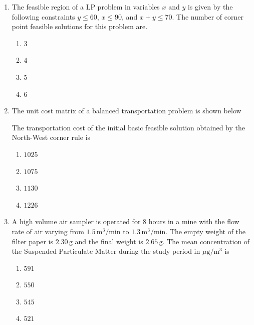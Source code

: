 \documentclass[journal,12pt,onecolumn]{IEEEtran}
\theoremstyle{remark}
\begin{document}
\begin{enumerate}
\item The feasible region of a LP problem in variables $x$ and $y$ is given by the following constraints  
$y \leq 60$, $x \leq 90$, and $x + y \leq 70$.
The number of corner point feasible solutions for this problem are.
\

\hfill{}

\begin{multicols}{4}
\begin{enumerate}
\item $3$
\item $4$
\item $5$
\item $6$
\end{enumerate}
\end{multicols}

\item The unit cost matrix of a balanced transportation problem is shown below
\begin{table}[H]
\centering

\end{table}
The transportation cost of the initial basic feasible solution obtained by the North-West corner rule is 

\hfill{}
\begin{multicols}{4}
\begin{enumerate}
\item $1025$
\item $1075$
\item $1130$
\item $1226$
\end{enumerate}
\end{multicols}

\item A high volume air sampler is operated for 8 hours in a mine with the flow rate of air varying from 
$1.5\, \mathrm{m}^3/\mathrm{min}$ to $1.3\, \mathrm{m}^3/\mathrm{min}$. The empty weight of the filter paper is 
$2.30\, \mathrm{g}$ and the final weight is $2.65\, \mathrm{g}$. The mean concentration of the Suspended 
Particulate Matter  during the study period in $\mu\mathrm{g}/\mathrm{m}^3$ is

\hfill{}
\begin{multicols}{4}
\begin{enumerate}
\item $591$
\item $550$
\item $ 545$
\item $ 521$
\end{enumerate}
\end{multicols}


\end{enumerate}
\end{document}
